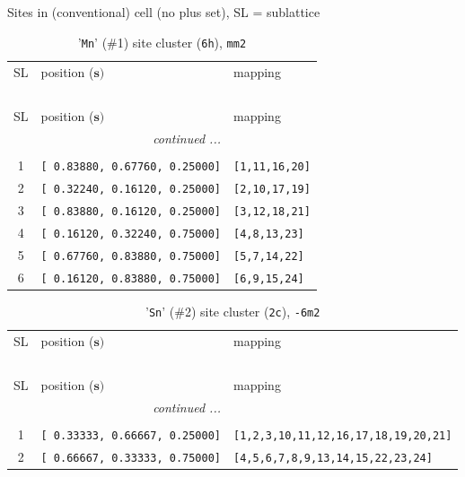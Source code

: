 \documentclass[fleqn,10pt,landscape]{jsarticle}
\begin{document}
\noindent Sites in (conventional) cell (no plus set), SL = sublattice

\renewcommand{\arraystretch}{1.6}
\begin{longtable}[l]{cll}
\captionsetup{justification=raggedright, singlelinecheck=off}
\caption{'\texttt{Mn}' (\#1) site cluster (\texttt{6h}), \texttt{mm2}}
 \\
 \hline \hline
SL & position ($\bm{s})$ & mapping \\ \hline \endfirsthead

\multicolumn{2}{l}{\tablename\ \thetable{}} \\
 \hline \hline
SL & position ($\bm{s})$ & mapping \\ \hline \endhead

 \hline \hline
\multicolumn{2}{r}{\footnotesize\it continued ...} \\ \endfoot

 \hline \hline
\multicolumn{2}{r}{} \\ \endlastfoot

1 & \texttt{[ 0.83880, 0.67760, 0.25000]} & \texttt{[1,11,16,20]} \\ \hline
2 & \texttt{[ 0.32240, 0.16120, 0.25000]} & \texttt{[2,10,17,19]} \\ \hline
3 & \texttt{[ 0.83880, 0.16120, 0.25000]} & \texttt{[3,12,18,21]} \\ \hline
4 & \texttt{[ 0.16120, 0.32240, 0.75000]} & \texttt{[4,8,13,23]} \\ \hline
5 & \texttt{[ 0.67760, 0.83880, 0.75000]} & \texttt{[5,7,14,22]} \\ \hline
6 & \texttt{[ 0.16120, 0.83880, 0.75000]} & \texttt{[6,9,15,24]} \\
\end{longtable}
\renewcommand{\arraystretch}{1.6}
\begin{longtable}[l]{cll}
\captionsetup{justification=raggedright, singlelinecheck=off}
\caption{'\texttt{Sn}' (\#2) site cluster (\texttt{2c}), \texttt{-6m2}}
 \\
 \hline \hline
SL & position ($\bm{s})$ & mapping \\ \hline \endfirsthead

\multicolumn{2}{l}{\tablename\ \thetable{}} \\
 \hline \hline
SL & position ($\bm{s})$ & mapping \\ \hline \endhead

 \hline \hline
\multicolumn{2}{r}{\footnotesize\it continued ...} \\ \endfoot

 \hline \hline
\multicolumn{2}{r}{} \\ \endlastfoot

1 & \texttt{[ 0.33333, 0.66667, 0.25000]} & \texttt{[1,2,3,10,11,12,16,17,18,19,20,21]} \\ \hline
2 & \texttt{[ 0.66667, 0.33333, 0.75000]} & \texttt{[4,5,6,7,8,9,13,14,15,22,23,24]} \\
\end{longtable}
\end{document}
